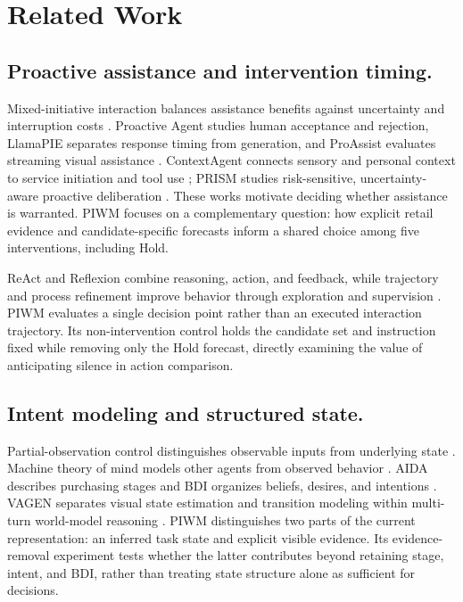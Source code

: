 \documentclass{article}
\begin{document}
\section{Related Work}\label{related-work}

\subsection{Proactive assistance and intervention
timing.}\label{proactive-assistance-and-intervention-timing.}

Mixed-initiative interaction balances assistance benefits against
uncertainty and interruption costs \citep{horvitz1999principles}.
Proactive Agent studies human acceptance and rejection, LlamaPIE
separates response timing from generation, and ProAssist evaluates
streaming visual assistance
\citep{lu2024proactive, chen2025llamapie, zhang2025proassist}.
ContextAgent connects sensory and personal context to service initiation
and tool use \citep{yang2026contextagent}; PRISM studies risk-sensitive,
uncertainty-aware proactive deliberation \citep{fu2026prism}. These
works motivate deciding whether assistance is warranted. PIWM focuses on
a complementary question: how explicit retail evidence and
candidate-specific forecasts inform a shared choice among five
interventions, including Hold.

ReAct and Reflexion combine reasoning, action, and feedback, while
trajectory and process refinement improve behavior through exploration
and supervision
\citep{yao2023react, shinn2023reflexion, song-etal-2024-trial, xiong-etal-2024-watch, wang-etal-2025-steca}.
PIWM evaluates a single decision point rather than an executed
interaction trajectory. Its non-intervention control holds the candidate
set and instruction fixed while removing only the Hold forecast,
directly examining the value of anticipating silence in action
comparison.

\subsection{Intent modeling and structured
state.}\label{intent-modeling-and-structured-state.}

Partial-observation control distinguishes observable inputs from
underlying state \citep{aastrom1965optimal}. Machine theory of mind
models other agents from observed behavior
\citep{rabinowitz2018machine}. AIDA describes purchasing stages and BDI
organizes beliefs, desires, and intentions
\citep{barry1987development, rao1995bdi}. VAGEN separates visual state
estimation and transition modeling within multi-turn world-model
reasoning \citep{wang2025vagen}. PIWM distinguishes two parts of the
current representation: an inferred task state and explicit visible
evidence. Its evidence-removal experiment tests whether the latter
contributes beyond retaining stage, intent, and BDI, rather than
treating state structure alone as sufficient for decisions.
\end{document}
